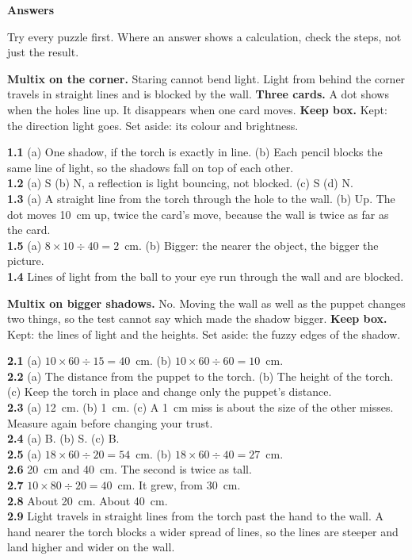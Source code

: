 \clearpage\label{answers}
{\sans\bfseries\LARGE\color{ink} Answers}\par
\small
Try every puzzle first. Where an answer shows a calculation, check the steps, not just the result.

\textbf{Multix on the corner.} Staring cannot bend light. Light from behind the corner travels in straight lines and is blocked by the wall. \textbf{Three cards.} A dot shows when the holes line up. It disappears when one card moves. \textbf{Keep box.} Kept: the direction light goes. Set aside: its colour and brightness.

\textbf{1.1} (a) One shadow, if the torch is exactly in line. (b) Each pencil blocks the same line of light, so the shadows fall on top of each other.\\
\textbf{1.2} (a) S (b) N, a reflection is light bouncing, not blocked. (c) S (d) N.\\
\textbf{1.3} (a) A straight line from the torch through the hole to the wall. (b) Up. The dot moves 10~cm up, twice the card's move, because the wall is twice as far as the card.\\
\textbf{1.5} (a) $8\times10\div40=2$~cm. (b) Bigger: the nearer the object, the bigger the picture.\\
\textbf{1.4} Lines of light from the ball to your eye run through the wall and are blocked.

\textbf{Multix on bigger shadows.} No. Moving the wall as well as the puppet changes two things, so the test cannot say which made the shadow bigger. \textbf{Keep box.} Kept: the lines of light and the heights. Set aside: the fuzzy edges of the shadow.

\textbf{2.1} (a) $10\times60\div15=40$~cm. (b) $10\times60\div60=10$~cm.\\
\textbf{2.2} (a) The distance from the puppet to the torch. (b) The height of the torch. (c) Keep the torch in place and change only the puppet's distance.\\
\textbf{2.3} (a) 12~cm. (b) 1~cm. (c) A 1~cm miss is about the size of the other misses. Measure again before changing your trust.\\
\textbf{2.4} (a) B. (b) S. (c) B.\\
\textbf{2.5} (a) $18\times60\div20=54$~cm. (b) $18\times60\div40=27$~cm.\\
\textbf{2.6} 20~cm and 40~cm. The second is twice as tall.\\
\textbf{2.7} $10\times80\div20=40$~cm. It grew, from 30~cm.\\
\textbf{2.8} About 20~cm. About 40~cm.\\
\textbf{2.9} Light travels in straight lines from the torch past the hand to the wall. A hand nearer the torch blocks a wider spread of lines, so the lines are steeper and land higher and wider on the wall.

